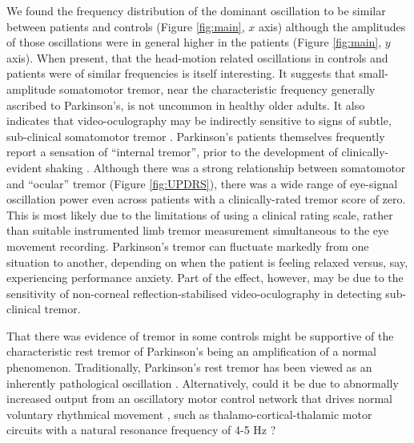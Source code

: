 \documentclass[jou,a4paper]{apa6}
\begin{document}
We found the frequency distribution of the dominant oscillation to be similar between patients and controls (Figure \ref{fig:main}, $x$ axis) although the amplitudes of those oscillations were in general higher in the patients (Figure \ref{fig:main}, $y$ axis). When present, that the head-motion related oscillations in controls and patients were of similar frequencies is itself interesting. It suggests that small-amplitude somatomotor tremor, near the characteristic frequency generally ascribed to Parkinson's, is not uncommon in healthy older adults. It also indicates that video-oculography may be indirectly sensitive to signs of subtle, sub-clinical somatomotor tremor \citep{MacAskill2013Ocular-tremor-i}. Parkinson's patients themselves frequently report a sensation of ``internal tremor'', prior to the development of clinically-evident shaking \citep{Shulman1996Internal-tremor}. Although there was a strong relationship between somatomotor and ``ocular'' tremor (Figure \ref{fig:UPDRS}), there was a wide range of eye-signal oscillation power even across patients with a clinically-rated tremor score of zero. This is most likely due to the limitations of using a clinical rating scale, rather than suitable instrumented limb tremor measurement simultaneous to the eye movement recording. Parkinson's tremor can fluctuate markedly from one situation to another, depending on when the patient is feeling relaxed versus, say, experiencing performance anxiety. Part of the effect, however, may be due to the sensitivity of non-corneal reflection-stabilised video-oculography in detecting sub-clinical tremor. 

That there was evidence of tremor in some controls might be supportive of the characteristic rest tremor of Parkinson's being an amplification of a normal phenomenon. Traditionally, Parkinson's rest tremor has been viewed as an inherently pathological oscillation \citep{McAuley2000Physiological-a}. Alternatively, could it be due to abnormally increased output from an oscillatory motor control network that drives normal voluntary rhythmical movement \citep{Burkhard2002Voluntarily-sim,Schnitzler2005Normal-and-path,Schnitzler2006Physiological-a}, such as thalamo-cortical-thalamic motor circuits with a natural resonance frequency of 4-5 Hz \citep{Volkmann1996Central-motor-l}?
\end{document}
